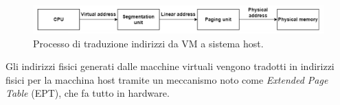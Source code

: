 \begin{figure}[!h]
	\centering
	\includegraphics[width=0.8\linewidth]{img/virtual-mem}
	\caption{Processo di traduzione indirizzi da VM a sistema host.}
	\label{fig:virtual-mem}
\end{figure}
Gli indirizzi fisici generati dalle macchine virtuali vengono tradotti in indirizzi fisici per la macchina host tramite un meccanismo noto come \textit{Extended Page Table} (EPT), che fa tutto in hardware.